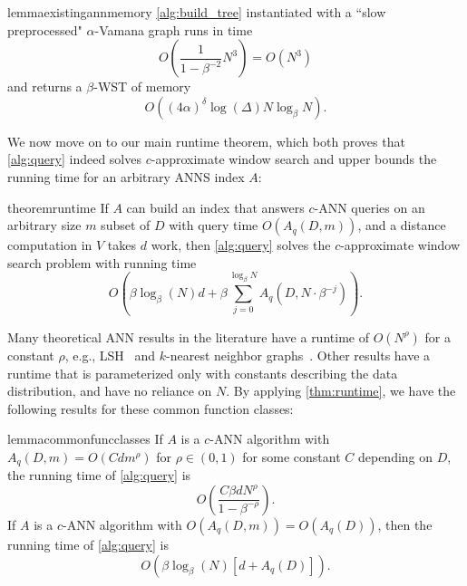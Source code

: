 \documentclass{article}
\theoremstyle{plain}
\theoremstyle{definition}
\theoremstyle{remark}
\newcommand{\shangdi}[1]{{\color{blue}{\bf Shangdi:} #1}}
\newcommand{\josh}[1]{{\color{orange}{\bf Josh:} #1}}
\begin{document}
\begin{restatable}{lemma}{existingannmemory}
\label{lem:existingannmemory}
\cref{alg:build_tree} instantiated with a ``slow preprocessed" $\alpha$-Vamana graph runs in time
$$O\left(\frac{1}{1 - \beta^{-2}} N^3\right) = O(N^3)$$ 
and returns a $\beta$-WST of memory
$$O\left((4\alpha)^\delta \log (\Delta) N \log_{\beta} N\right).$$
\end{restatable}

We now move on to our main runtime theorem, which both proves that \cref{alg:query} indeed solves $c$-approximate window search and upper bounds the running time for an arbitrary ANNS index $A$:

\begin{restatable}{theorem}{runtime}
\label{thm:runtime}
If $A$ can build an index that answers $c$-ANN queries on an arbitrary size $m$ subset of $D$ with query time $O(A_q(D, m))$, and a distance computation in $V$ takes $d$ work, then \cref{alg:query} solves the $c$-approximate window search problem with running time      
$$O\left(\beta\log_\beta(N)d + \beta\sum_{j=0}^{\log_\beta{N}} A_q(D, N \cdot \beta^{-j})\right).$$
\end{restatable}


Many theoretical ANN results in the literature have a runtime of $O(N^\rho)$ for a constant $\rho$, e.g., LSH~\cite{andoni2008near} and $k$-nearest neighbor graphs~\cite{prokhorenkova2020graph}. Other results have a runtime that is parameterized only with constants describing the data distribution, and have no reliance on $N$. By applying \cref{thm:runtime}, we have the following results for these common function classes:
\begin{restatable}{lemma}{commonfuncclasses}
\label{lem:commonfuncclasses}
If $A$ is a $c$-ANN algorithm with $A_q(D, m) = O(Cdm^\rho)$ for $\rho \in (0, 1)$ for some constant $C$ depending on $D$, the running time of \cref{alg:query} is
$$O\left(\frac{C\beta dN^\rho}{1 - \beta^{-\rho}}\right).$$
If $A$ is a $c$-ANN algorithm with $O(A_q(D, m)) = O(A_q(D))$, then the running time of \cref{alg:query} is
$$O\left(\beta \log_\beta(N)[d + A_q(D)]\right).$$
\end{restatable}
\end{document}
